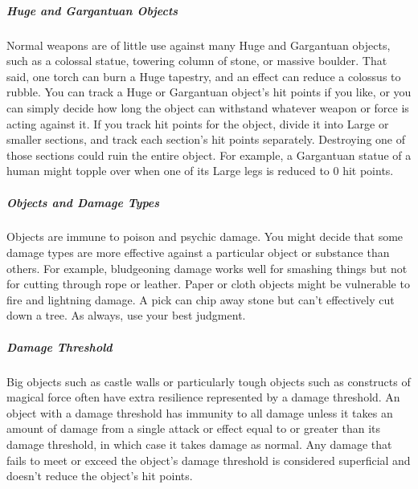 \subparagraph*{Huge and Gargantuan Objects} Normal weapons are of little use against many Huge and Gargantuan objects, such as a colossal statue, towering column of stone, or massive boulder. That said, one torch can burn a Huge tapestry, and an  effect can reduce a colossus to rubble. You can track a Huge or Gargantuan object's hit points if you like, or you can simply decide how long the object can withstand whatever weapon or force is acting against it. If you track hit points for the object, divide it into Large or smaller sections, and track each section's hit points separately. Destroying one of those sections could ruin the entire object. For example, a Gargantuan statue of a human might topple over when one of its Large legs is reduced to 0 hit points.

\subparagraph*{Objects and Damage Types} Objects are immune to poison and psychic damage. You might decide that some damage types are more effective against a particular object or substance than others. For example, bludgeoning damage works well for smashing things but not for cutting through rope or leather. Paper or cloth objects might be vulnerable to fire and lightning damage. A pick can chip away stone but can't effectively cut down a tree. As always, use your best judgment.

\subparagraph*{Damage Threshold} Big objects such as castle walls or particularly tough objects such as constructs of magical force often have extra resilience represented by a damage threshold. An object with a damage threshold has immunity to all damage unless it takes an amount of damage from a single attack or effect equal to or greater than its damage threshold, in which case it takes damage as normal. Any damage that fails to meet or exceed the object's damage threshold is considered superficial and doesn't reduce the object's hit points.
